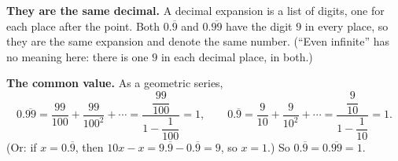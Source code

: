 \textbf{They are the same decimal.} A decimal expansion is a list of digits, one for each place after the point. Both $0.\overline9$ and $0.\overline{99}$ have the digit $9$ in every place, so they are the same expansion and denote the same number. (``Even infinite'' has no meaning here: there is one $9$ in each decimal place, in both.)

\textbf{The common value.} As a geometric series,
\[0.\overline{99}=\dfrac{99}{100}+\dfrac{99}{100^2}+\cdots=\dfrac{\dfrac{99}{100}}{1-\dfrac1{100}}=1,\qquad0.\overline9=\dfrac{9}{10}+\dfrac{9}{10^2}+\cdots=\dfrac{\dfrac9{10}}{1-\dfrac1{10}}=1.\]
(Or: if $x=0.\overline9$, then $10x-x=9.\overline9-0.\overline9=9$, so $x=1$.) So $0.\overline9=0.\overline{99}=\boxed{1}$.
